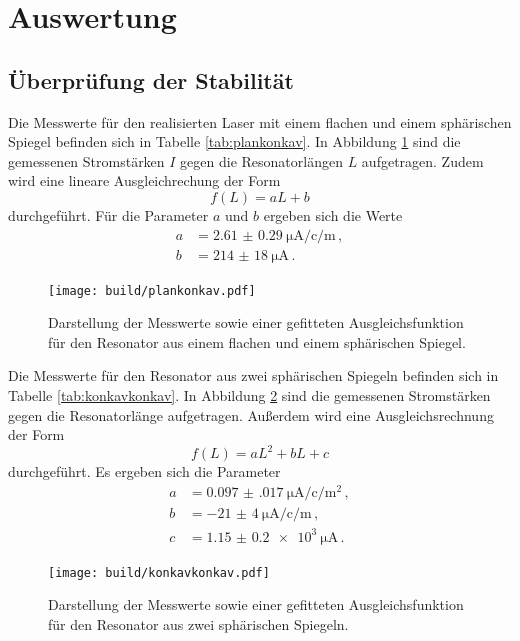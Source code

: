 \section{Auswertung}
\label{sec:Auswertung}

\subsection{Überprüfung der Stabilität}
\label{subsec:stabilitaet}
Die Messwerte für den realisierten Laser mit einem flachen und einem sphärischen
Spiegel befinden sich in Tabelle \ref{tab:plankonkav}. In Abbildung \ref{fig:plankonkav}
sind die gemessenen Stromstärken $I$ gegen die Resonatorlängen $L$ aufgetragen.
Zudem wird eine lineare Ausgleichrechung der Form
\begin{equation*}
  f(L)=a L+b
\end{equation*}
durchgeführt. Für die Parameter $a$ und $b$ ergeben sich die Werte
\begin{align*}
  a&= \SI{2.61(029)}{\micro\ampere\per\centi\per\metre}\,,\\
  b&= \SI{214(18)}{\micro\ampere}\,.
\end{align*}

\begin{figure}
  \centering
  \texttt{[image: build/plankonkav.pdf]}
  \caption{Darstellung der Messwerte sowie einer gefitteten Ausgleichsfunktion für den
  Resonator aus einem flachen und einem sphärischen Spiegel.}
  \label{fig:plankonkav}
\end{figure}

Die Messwerte für den Resonator aus zwei sphärischen Spiegeln befinden sich in
Tabelle \ref{tab:konkavkonkav}. In Abbildung \ref{fig:konkavkonkav} sind die gemessenen Stromstärken gegen die Resonatorlänge aufgetragen. Außerdem wird eine
Ausgleichsrechnung der Form
\begin{equation*}
  f(L)=a L^2 + b L + c
\end{equation*}
durchgeführt. Es ergeben sich die Parameter
\begin{align*}
  a&= \SI{0.097(017)}{\micro\ampere\per\centi\per\metre\squared}\,, \\
  b&= \SI{-21(4)}{\micro\ampere\per\centi\per\metre}\,, \\
  c&= \SI{1.15(020)e3}{\micro\ampere}\,.
\end{align*}

\begin{figure}
  \centering
  \texttt{[image: build/konkavkonkav.pdf]}
  \caption{Darstellung der Messwerte sowie einer gefitteten Ausgleichsfunktion für den
  Resonator aus zwei sphärischen Spiegeln.}
  \label{fig:konkavkonkav}
\end{figure}

